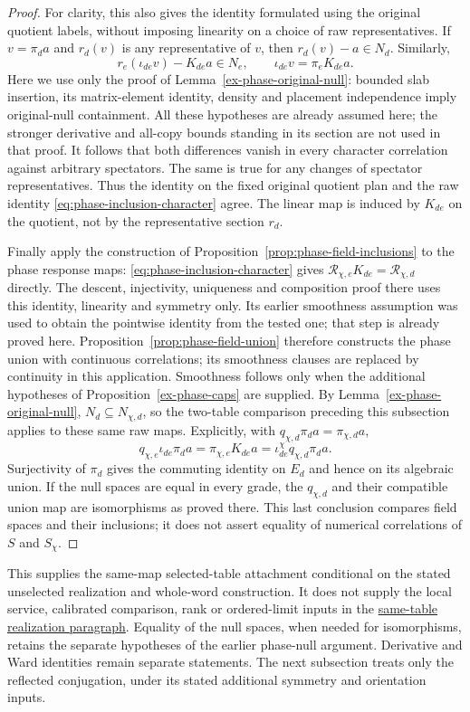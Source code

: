 \begin{proof}
For clarity, this also gives the identity formulated using the original
quotient labels, without imposing linearity on a choice of raw
representatives. If $v=\pi_da$ and $r_d(v)$ is any representative of $v$,
then $r_d(v)-a\in N_d$. Similarly,
\[
 r_e(\iota_{de}v)-K_{de}a\in N_e,
 \qquad \iota_{de}v=\pi_eK_{de}a.
\]
Here we use only the proof of Lemma~\ref{ex-phase-original-null}: bounded
slab insertion, its matrix-element identity, density and placement
independence imply original-null containment. All these hypotheses are
already assumed here; the stronger derivative and all-copy bounds standing
in its section are not used in that proof. It follows that both differences vanish in
every character correlation against arbitrary spectators. The same is
true for any changes of spectator representatives. Thus the identity on
the fixed original quotient plan and the raw identity
\eqref{eq:phase-inclusion-character} agree. The linear map is induced by
$K_{de}$ on the quotient, not by the representative section $r_d$.

Finally apply the construction of
Proposition~\ref{prop:phase-field-inclusions} to the phase response maps:
\eqref{eq:phase-inclusion-character} gives
$\mathcal R_{\chi,e}K_{de}=\mathcal R_{\chi,d}$ directly. The descent,
injectivity, uniqueness and composition proof there uses this identity,
linearity and symmetry only. Its earlier smoothness assumption was used
to obtain the pointwise identity from the tested one; that step is already
proved here. Proposition~\ref{prop:phase-field-union} therefore constructs
the phase union with continuous correlations; its smoothness clauses are
replaced by continuity in this application. Smoothness follows only when
the additional hypotheses of Proposition~\ref{ex-phase-caps} are supplied. By Lemma~\ref{ex-phase-original-null},
$N_d\subseteq N_{\chi,d}$, so the two-table comparison preceding this
subsection applies to these same raw maps. Explicitly, with
$q_{\chi,d}\pi_da=\pi_{\chi,d}a$,
\[
 q_{\chi,e}\iota_{de}\pi_da
 =\pi_{\chi,e}K_{de}a
 =\iota^\chi_{de}q_{\chi,d}\pi_da.
\]
Surjectivity of $\pi_d$ gives the commuting identity on $E_d$ and hence
on its algebraic union. If the null spaces are equal in every grade,
the $q_{\chi,d}$ and their compatible union map are isomorphisms as
proved there. This last conclusion compares field spaces and their
inclusions; it does not assert equality of numerical correlations of
$S$ and $S_\chi$.
\end{proof}

This supplies the same-map selected-table attachment conditional on the
stated unselected realization and whole-word construction. It does not
supply the local service, calibrated comparison, rank or ordered-limit
inputs in the \hyperref[par:phase-inclusion-attachment]{same-table
realization paragraph}. Equality of the
null spaces, when needed for isomorphisms, retains the separate hypotheses
of the earlier phase-null argument. Derivative and Ward identities remain
separate statements. The next subsection treats only the reflected
conjugation, under its stated additional symmetry and orientation inputs.

